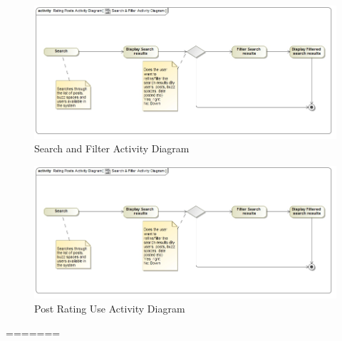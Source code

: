 \documentclass[11pt]{article}
\begin{document}
					
	
	\graphicspath{ {../Diagrams/Sphe/Search&Filter/} }
	  \begin{figure}[H]	
    	\includegraphics[scale=0.65]{ActivityDiagram.jpg}
    	\caption{Search and Filter Activity Diagram}
	\end{figure}
	
	\graphicspath{ {../Diagrams/Sphe/PostRatings/} }
	  \begin{figure}[H]	
    	\includegraphics[scale=0.65]{ActivityDiagram.jpg}
    	\caption{Post Rating Use Activity Diagram}
	\end{figure}
	
=======
\end{document}
